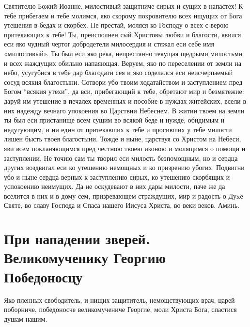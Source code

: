

Святителю Божий Иоанне, милостивый защитниче сирых и сущих в напастех! К тебе прибегаем и тебе молимся, яко скорому покровителю всех ищущих от Бога утешения в бедах и скорбех. Hе престай, моляся ко Господу о всех с верою притекающих к тебе! Ты, преисполнен сый Христовы любви и благости, явился еси яко чудный чертог добродетели милосердия и стяжал еси себе имя «милостивый». Ты был еси яко река, непрестанно текущая щедрыми милостьми и всех жаждущих обильно напаяющая. Веруем, яко по переселении от земли на небо, усугубися в тебе дар благодати сея и яко соделался еси неисчерпаемый сосуд всякия благостыни. Сотвори убо твоим ходатайством и заступлением пред Богом “всякия утехи”, да вси, прибегающий к тебе, обретают мир и безмятежие: даруй им утешение в печалех временных и пособие в нуждах житейских, всели в них надежду вечнаго упокоения во Царствии Небеснем. В житии твоем на земли ты был еси пристанище всем сущим во всякой беде и нужде, обидимым и недугующим, и ни един от притекавших к тебе и просивших у тебе милости лишен бысть твоея благостыни. Тожде и ныне, царствуя со Христом на Небеси, яви всем покланяющимся пред честною твоею иконою и молящимся о помощи и заступлении. Не точию сам ты творил еси милость безпомощным, но и сердца других воздвигал еси ко утешению немощных и ко призрению убогих. Подвигни убо и ныне сердца верных к заступлению сирых, ко утешению скорбящих и успокоению неимущих. Да не оскудевают в них дары милости, паче же да вселится в них и в дому сем, призревающем страждущих, мир и радость о Дуxе Святе, во славу Господа и Спаса нашего Иисуса Христа, во веки веков. Аминь.
\longpage{}\mychapterending


 

\section{При нападении зверей.  Великомученику Георгию Победоносцу}
 




Яко пленных свободитель, и нищих защититель, немощствующих врач, царей поборниче, победоносче великомучениче Георгие, моли Христа Бога, спастися душам нашим.




